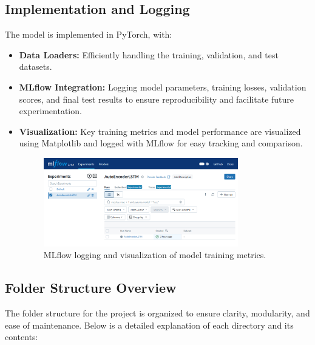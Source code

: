 \subsection{Implementation and Logging}
The model is implemented in PyTorch, with:
\begin{itemize}
    \item \textbf{Data Loaders:} Efficiently handling the training, validation, and test datasets.
    \item \textbf{MLflow Integration:} Logging model parameters, training losses, validation scores, and final test results to ensure reproducibility and facilitate future experimentation.
    
    \item \textbf{Visualization:} Key training metrics and model performance are visualized using Matplotlib and logged with MLflow for easy tracking and comparison.
    
    \begin{figure}[H]
        \centering
        \includegraphics[width=0.8\textwidth]{images/mlflow.png}
        \caption{MLflow logging and visualization of model training metrics.}
        \label{fig:mlflow}
    \end{figure}
\end{itemize}
\subsection{Folder Structure Overview}
The folder structure for the project is organized to ensure clarity, modularity, and ease of maintenance. Below is a detailed explanation of each directory and its contents:

